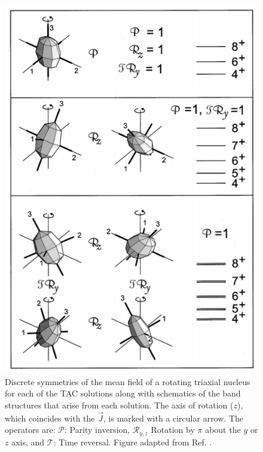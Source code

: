 \begin{figure}[t!]
\centerline{\includegraphics[height=0.6\textheight]{./img/c2/tacsolutions.png}}
	\caption{Discrete symmetries of the mean field of a rotating triaxial nucleus for each of the TAC solutions along with schematics of the band structures that arise from each solution. The axis of rotation ($z$), which coincides with the $\vec{J}$, is marked with a circular arrow. The operators are: $\mathscr{P}$: Parity inversion, $\mathscr{R}_{y,z}$ Rotation by $\pi$ about the $y$ or $z$ axis, and $\mathscr{T}$: Time reversal. Figure adapted from Ref. \cite{frauendorfTAC}.\label{fig:chp2-TAC-solution-types}}
\end{figure}

